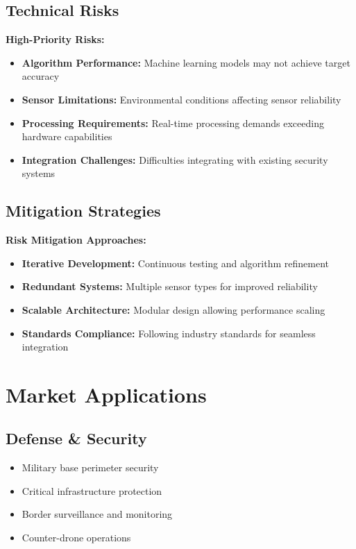 \documentclass[11pt,a4paper]{article}
\begin{document}
\subsection{Technical Risks}
\begin{warning}
\textbf{High-Priority Risks:}
\begin{itemize}
    \item \textbf{Algorithm Performance:} Machine learning models may not achieve target accuracy
    \item \textbf{Sensor Limitations:} Environmental conditions affecting sensor reliability
    \item \textbf{Processing Requirements:} Real-time processing demands exceeding hardware capabilities
    \item \textbf{Integration Challenges:} Difficulties integrating with existing security systems
\end{itemize}
\end{warning}

\subsection{Mitigation Strategies}
\begin{success}
\textbf{Risk Mitigation Approaches:}
\begin{itemize}
    \item \textbf{Iterative Development:} Continuous testing and algorithm refinement
    \item \textbf{Redundant Systems:} Multiple sensor types for improved reliability
    \item \textbf{Scalable Architecture:} Modular design allowing performance scaling
    \item \textbf{Standards Compliance:} Following industry standards for seamless integration
\end{itemize}
\end{success}

\section{Market Applications}

\subsection{Defense \& Security}
\begin{itemize}[leftmargin=2em]
    \item Military base perimeter security
    \item Critical infrastructure protection
    \item Border surveillance and monitoring
    \item Counter-drone operations
\end{itemize}
\end{document}
